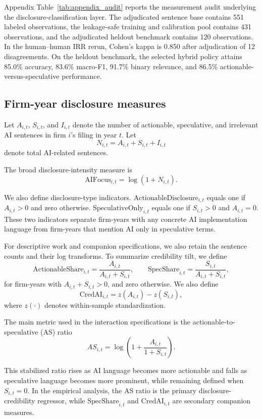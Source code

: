 Appendix Table~\ref{tab:appendix_audit} reports the measurement audit underlying the disclosure-classification layer. The adjudicated sentence base contains 551 labeled observations, the leakage-safe training and calibration pool contains 431 observations, and the adjudicated heldout benchmark contains 120 observations. In the human--human IRR rerun, Cohen's kappa is 0.850 after adjudication of 12 disagreements. On the heldout benchmark, the selected hybrid policy attains 85.0\% accuracy, 83.6\% macro-F1, 91.7\% binary relevance, and 86.5\% actionable-versus-speculative performance.

\subsection{Firm-year disclosure measures}

Let $A_{i,t}$, $S_{i,t}$, and $I_{i,t}$ denote the number of actionable, speculative, and irrelevant AI sentences in firm $i$'s filing in year $t$. Let
\[
N_{i,t} = A_{i,t} + S_{i,t} + I_{i,t}
\]
denote total AI-related sentences.

The broad disclosure-intensity measure is
\[
\mathrm{AI Focus}_{i,t} = \log(1 + N_{i,t}).
\]

We also define disclosure-type indicators. $\mathrm{ActionableDisclosure}_{i,t}$ equals one if $A_{i,t} > 0$ and zero otherwise. $\mathrm{SpeculativeOnly}_{i,t}$ equals one if $S_{i,t} > 0$ and $A_{i,t} = 0$. These two indicators separate firm-years with any concrete AI implementation language from firm-years that mention AI only in speculative terms.

For descriptive work and companion specifications, we also retain the sentence counts and their log transforms. To summarize credibility tilt, we define
\[
\mathrm{ActionableShare}_{i,t} = \frac{A_{i,t}}{A_{i,t} + S_{i,t}},
\qquad
\mathrm{SpecShare}_{i,t} = \frac{S_{i,t}}{A_{i,t} + S_{i,t}},
\]
for firm-years with $A_{i,t} + S_{i,t} > 0$, and zero otherwise. We also define
\[
\mathrm{CredAI}_{i,t} = z(A_{i,t}) - z(S_{i,t}),
\]
where $z(\cdot)$ denotes within-sample standardization.

The main metric used in the interaction specifications is the actionable-to-speculative (AS) ratio
\[
AS_{i,t} = \log\left(1 + \frac{A_{i,t}}{1 + S_{i,t}}\right).
\]

This stabilized ratio rises as AI language becomes more actionable and falls as speculative language becomes more prominent, while remaining defined when $S_{i,t} = 0$. In the empirical analysis, the AS ratio is the primary disclosure-credibility regressor, while $\mathrm{SpecShare}_{i,t}$ and $\mathrm{CredAI}_{i,t}$ are secondary companion measures.

